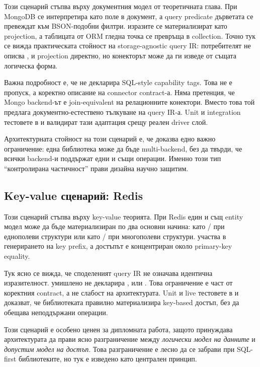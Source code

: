 Този сценарий стъпва върху документния модел от теоретичната глава. При MongoDB  се интерпретира като поле в документ, а query predicate дърветата се превеждат към BSON-подобни филтри.  изразите се материализират като projection, а таблицата от ORM гледна точка се превръща в collection. Точно тук се вижда практическата стойност на storage-agnostic query IR: потребителят не описва ,  и projection директно, но конекторът може да ги изведе от същата логическа форма.

Важна подробност е, че  не декларира SQL-style capability tags. Това не е пропуск, а коректно описание на connector contract-а. Няма претенция, че Mongo backend-ът е join-equivalent на релационните конектори. Вместо това той предлага документно-естествено тълкуване на query IR-а. Unit и integration тестовете в  и  валидират тази адаптация срещу реален driver слой.

Архитектурната стойност на този сценарий е, че доказва едно важно ограничение: една библиотека може да бъде multi-backend, без да твърди, че всички backend-и поддържат едни и същи операции. Именно този тип ``контролирана частичност'' прави дизайна научно защитим.

\subsection{Key-value сценарий: Redis}

Този сценарий стъпва върху key-value теорията. При Redis един и същ entity модел може да бъде материализиран по два основни начина: като / при еднополеви структури или като / при многополеви структури.  участва в генерирането на key prefix, а достъпът е концентриран около primary-key equality.

Тук ясно се вижда, че споделеният query IR не означава идентична изразителност.  умишлено не декларира ,  или . Това ограничение е част от коректния contract, а не слабост на архитектурата. Unit и live тестовете в  и  доказват, че библиотеката правилно материализира key-based достъп, без да обещава неподдържани операции.

Този сценарий е особено ценен за дипломната работа, защото принуждава архитектурата да прави ясно разграничение между \emph{логически модел на данните} и \emph{допустим модел на достъп}. Това разграничение е лесно да се забрави при SQL-first библиотеките, но тук е изведено като централен принцип.

